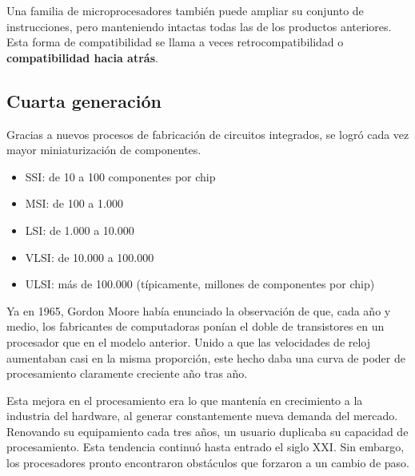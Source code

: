 \documentclass[spanish,A4,]{article}
\begin{document}
Una familia de microprocesadores también puede ampliar su conjunto de
instrucciones, pero manteniendo intactas todas las de los productos
anteriores. Esta forma de compatibilidad se llama a veces
retrocompatibilidad o \textbf{compatibilidad hacia atrás}.

\subsection{Cuarta generación}\label{cuarta-generaciuxf3n}

Gracias a nuevos procesos de fabricación de circuitos integrados, se
logró cada vez mayor miniaturización de componentes.

\begin{itemize}
\itemsep1pt\parskip0pt
\item
  SSI: de 10 a 100 componentes por chip
\item
  MSI: de 100 a 1.000
\item
  LSI: de 1.000 a 10.000
\item
  VLSI: de 10.000 a 100.000
\item
  ULSI: más de 100.000 (típicamente, millones de componentes por chip)
\end{itemize}

Ya en 1965, Gordon Moore había enunciado la observación de que, cada año
y medio, los fabricantes de computadoras ponían el doble de transistores
en un procesador que en el modelo anterior. Unido a que las velocidades
de reloj aumentaban casi en la misma proporción, este hecho daba una
curva de poder de procesamiento claramente creciente año tras año.

Esta mejora en el procesamiento era lo que mantenía en crecimiento a la
industria del hardware, al generar constantemente nueva demanda del
mercado. Renovando su equipamiento cada tres años, un usuario duplicaba
su capacidad de procesamiento. Esta tendencia continuó hasta entrado el
siglo XXI. Sin embargo, los procesadores pronto encontraron obstáculos
que forzaron a un cambio de paso.
\end{document}
